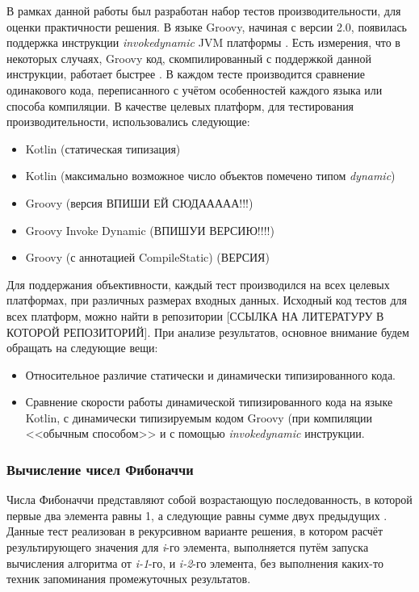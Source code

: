 В рамках данной работы был разработан набор тестов производительности, для оценки практичности решения. В языке Groovy, начиная с версии 2.0, появилась поддержка инструкции \textit{invokedynamic} JVM платформы \cite{groovy:invokeDynamicSupport}. Есть измерения, что в некоторых случаях, Groovy код, скомпилированный с поддержкой данной инструкции, работает быстрее \cite{groovy:indyTest1}.
В каждом тесте производится сравнение одинакового кода, переписанного с учётом особенностей каждого языка или способа компиляции. В качестве целевых платформ, для тестирования производительности, использовались следующие:

\begin{itemize}
    \item Kotlin (статическая типизация) 
    \item Kotlin (максимально возможное число объектов помечено типом \textit{dynamic})
    \item Groovy (версия ВПИШИ ЕЙ СЮДААААА!!!)
    \item Groovy Invoke Dynamic (ВПИШУИ ВЕРСИЮ!!!!)
    \item Groovy (с аннотацией \at CompileStatic) (ВЕРСИЯ)
\end{itemize}


Для поддержания объективности, каждый тест производился на всех целевых платформах, при различных размерах входных данных. Исходный код тестов для всех платформ, можно найти в репозитории [ССЫЛКА НА ЛИТЕРАТУРУ В КОТОРОЙ РЕПОЗИТОРИЙ]. При анализе результатов, основное внимание будем обращать на следующие вещи:

\begin{itemize}
    \item Относительное различие статически и динамически типизированного кода.
    \item Сравнение скорости работы динамической типизированного кода на языке Kotlin, с динамически типизируемым кодом Groovy (при компиляции <<обычным способом>> и с помощью \textit{invokedynamic} инструкции.
\end{itemize}

\subsubsection{Вычисление чисел Фибоначчи}

Числа Фибоначчи представляют собой возрастающую последованность, в которой первые два элемента равны 1, а следующие равны сумме двух предыдущих \cite{math:vilenkin1969Combinatorics}. Данные тест реализован в рекурсивном варианте решения, в котором расчёт результирующего значения для \textit{i}-го элемента, выполняется путём запуска вычисления алгоритма от \textit{i-1}-го, и \textit{i-2}-го элемента, без выполнения каких-то техник запоминания промежуточных результатов.

